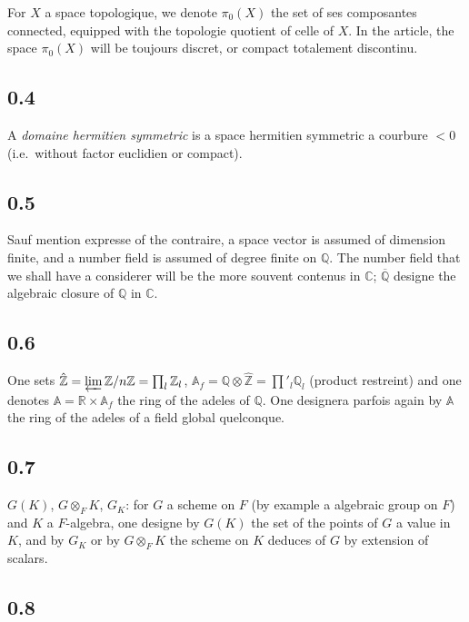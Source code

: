 \documentclass[12pt,a4paper]{article}
\theoremstyle{plain}
\theoremstyle{definition}
\theoremstyle{remark}
\newcommand{\ZZ}{\mathbb{Z}}
\newcommand{\QQ}{\mathbb{Q}}
\newcommand{\RR}{\mathbb{R}}
\newcommand{\CC}{\mathbb{C}}
\newcommand{\Af}{\mathbb{A}_f}
\newcommand{\A}{\mathbb{A}}
\begin{document}
For $X$ a space topologique, we denote $\pi_0(X)$ the set of ses composantes connected, equipped with the topologie quotient of celle of $X$. In the article, the space $\pi_0(X)$ will be toujours discret, or compact totalement discontinu.

\subsection*{0.4}

A \textit{domaine hermitien symmetric} is a space hermitien symmetric a courbure $< 0$ (i.e.~without factor euclidien or compact).

\subsection*{0.5}

Sauf mention expresse of the contraire, a space vector is assumed of dimension finite, and a number field is assumed of degree finite on $\QQ$. The number field that we shall have a considerer will be the more souvent contenus in $\CC$; $\overline{\QQ}$ designe the algebraic closure of $\QQ$ in $\CC$.

\subsection*{0.6}

One sets $\hat{\ZZ} = \varprojlim \ZZ/n\ZZ = \prod_l \ZZ_l$, $\Af = \QQ \otimes \hat{\ZZ} = {\prod}'_l \QQ_l$ (product restreint) and one denotes $\A = \RR \times \Af$ the ring of the adeles of $\QQ$. One designera parfois again by $\A$ the ring of the adeles of a field global quelconque.

\subsection*{0.7}

$G(K)$, $G \otimes_F K$, $G_K$: for $G$ a scheme on $F$ (by example a algebraic group on $F$) and $K$ a $F$-algebra, one designe by $G(K)$ the set of the points of $G$ a value in $K$, and by $G_K$ or by $G \otimes_F K$ the scheme on $K$ deduces of $G$ by extension of scalars.

\subsection*{0.8}
\end{document}
